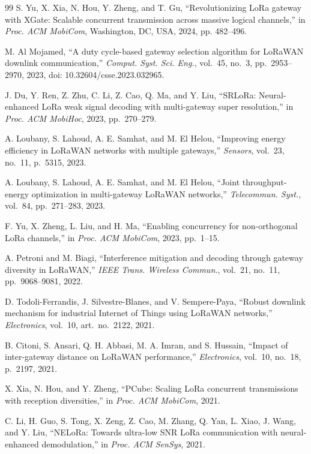 \documentclass[journal]{IEEEtran}
\begin{document}
\begin{thebibliography}{99}
S. Yu, X. Xia, N. Hou, Y. Zheng, and T. Gu, ``Revolutionizing LoRa gateway with
XGate: Scalable concurrent transmission across massive logical channels,'' in
\emph{Proc. ACM MobiCom}, Washington, DC, USA, 2024, pp. 482--496.


M. Al Mojamed, ``A duty cycle-based gateway selection algorithm for LoRaWAN downlink communication,'' \emph{Comput. Syst. Sci. Eng.}, vol.\ 45, no.\ 3, pp.\ 2953--2970, 2023, doi: 10.32604/csse.2023.032965.


J. Du, Y. Ren, Z. Zhu, C. Li, Z. Cao, Q. Ma, and Y. Liu, ``SRLoRa: Neural-enhanced LoRa weak signal decoding with multi-gateway super resolution,'' in \emph{Proc. ACM MobiHoc}, 2023, pp.\ 270--279.


A. Loubany, S. Lahoud, A. E. Samhat, and M. El Helou, ``Improving energy efficiency in LoRaWAN networks with multiple gateways,'' \emph{Sensors}, vol.\ 23, no.\ 11, p.\ 5315, 2023.


A. Loubany, S. Lahoud, A. E. Samhat, and M. El Helou, ``Joint throughput-energy optimization in multi-gateway LoRaWAN networks,'' \emph{Telecommun. Syst.}, vol.\ 84, pp.\ 271--283, 2023.


F. Yu, X. Zheng, L. Liu, and H. Ma, ``Enabling concurrency for non-orthogonal LoRa channels,'' in \emph{Proc. ACM MobiCom}, 2023, pp.\ 1--15.


A. Petroni and M. Biagi, ``Interference mitigation and decoding through gateway diversity in LoRaWAN,'' \emph{IEEE Trans. Wireless Commun.}, vol.\ 21, no.\ 11, pp.\ 9068--9081, 2022.


D. Todoli-Ferrandis, J. Silvestre-Blanes, and V. Sempere-Paya, ``Robust downlink mechanism for industrial Internet of Things using LoRaWAN networks,'' \emph{Electronics}, vol.\ 10, art.\ no.\ 2122, 2021.


B. Citoni, S. Ansari, Q. H. Abbasi, M. A. Imran, and S. Hussain, ``Impact of inter-gateway distance on LoRaWAN performance,'' \emph{Electronics}, vol.\ 10, no.\ 18, p.\ 2197, 2021.


X. Xia, N. Hou, and Y. Zheng, ``PCube: Scaling LoRa concurrent transmissions with reception diversities,'' in \emph{Proc. ACM MobiCom}, 2021.


C. Li, H. Guo, S. Tong, X. Zeng, Z. Cao, M. Zhang, Q. Yan, L. Xiao, J. Wang, and Y. Liu, ``NELoRa: Towards ultra-low SNR LoRa communication with neural-enhanced demodulation,'' in \emph{Proc. ACM SenSys}, 2021.



\end{thebibliography}
\end{document}

